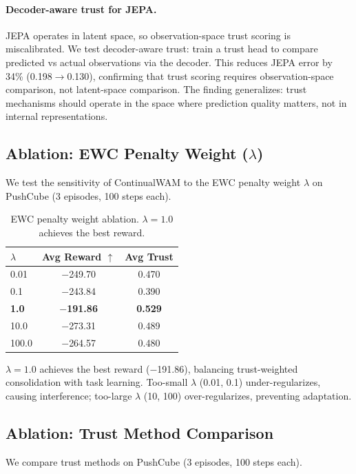 \documentclass{article}
\begin{document}
\paragraph{Decoder-aware trust for JEPA.} JEPA operates in latent space, so observation-space trust scoring is miscalibrated. We test decoder-aware trust: train a trust head to compare predicted vs actual observations via the decoder. This reduces JEPA error by 34\% (0.198$\to$0.130), confirming that trust scoring requires observation-space comparison, not latent-space comparison. The finding generalizes: trust mechanisms should operate in the space where prediction quality matters, not in internal representations.

\subsection{Ablation: EWC Penalty Weight ($\lambda$)}

We test the sensitivity of ContinualWAM to the EWC penalty weight $\lambda$ on PushCube (3 episodes, 100 steps each).

\begin{table}[h]
\centering
\caption{EWC penalty weight ablation. $\lambda=1.0$ achieves the best reward.}
\label{tab:ablation_lambda}
\begin{tabular}{lcc}
\toprule
$\lambda$ & Avg Reward $\uparrow$ & Avg Trust \\
\midrule
0.01 & $-$249.70 & 0.470 \\
0.1 & $-$243.84 & 0.390 \\
\textbf{1.0} & \textbf{$-$191.86} & \textbf{0.529} \\
10.0 & $-$273.31 & 0.489 \\
100.0 & $-$264.57 & 0.480 \\
\bottomrule
\end{tabular}
\end{table}

$\lambda=1.0$ achieves the best reward ($-$191.86), balancing trust-weighted consolidation with task learning. Too-small $\lambda$ (0.01, 0.1) under-regularizes, causing interference; too-large $\lambda$ (10, 100) over-regularizes, preventing adaptation.

\subsection{Ablation: Trust Method Comparison}

We compare trust methods on PushCube (3 episodes, 100 steps each).
\end{document}
